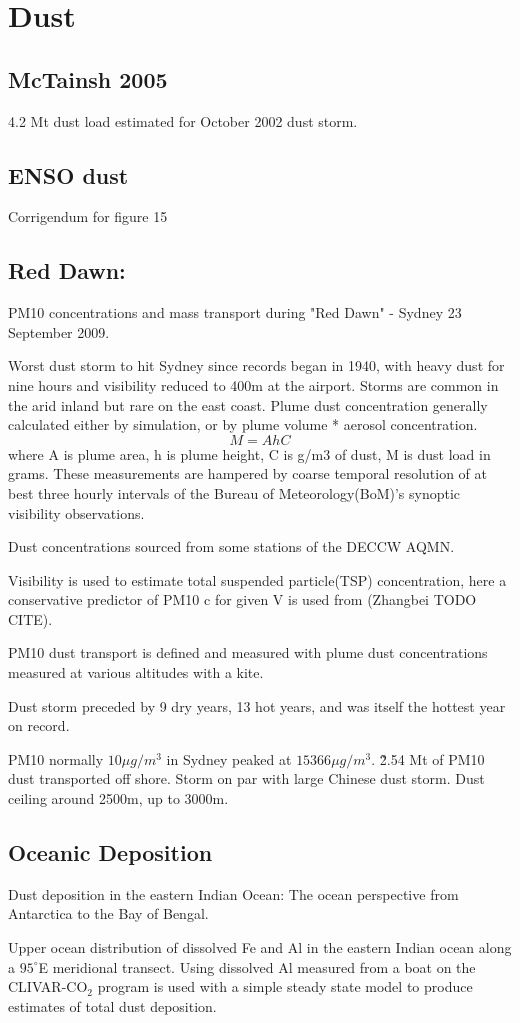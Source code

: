 \section{Dust}

\subsection{McTainsh 2005}
4.2 Mt dust load estimated for October 2002 dust storm.

\subsection{ENSO dust \cite{Rotstayn_2011}}
Corrigendum for figure 15

\subsection{Red Dawn: \cite{Leys_2011}}
PM10 concentrations and mass transport during "Red Dawn" - Sydney 23 September 2009.

Worst dust storm to hit Sydney since records began in 1940, with heavy dust for nine hours and visibility reduced to 400m at the airport.
Storms are common in the arid inland but rare on the east coast.
Plume dust concentration generally calculated either by simulation, or by plume volume * aerosol concentration.
$$M = AhC$$ 
where A is plume area, h is plume height, C is g/m3 of dust, M is dust load in grams.
These measurements are hampered by coarse temporal resolution of at best three hourly intervals of the Bureau of Meteorology(BoM)'s synoptic visibility observations.

Dust concentrations sourced from some stations of the DECCW AQMN.

Visibility is used to estimate total suspended particle(TSP) concentration, here a conservative predictor of PM10 c for given V is used from (Zhangbei TODO CITE).

PM10 dust transport is defined and measured with plume dust concentrations measured at various altitudes with a kite. 

Dust storm preceded by 9 dry years, 13 hot years, and was itself the hottest year on record.

PM10 normally $10{\mu}g/m^3$ in Sydney peaked at $15366{\mu}g/m^3$.
\~2.54 Mt of PM10 dust transported off shore.
Storm on par with large Chinese dust storm.
Dust ceiling around 2500m, up to 3000m.


\subsection{Oceanic Deposition \cite{Grand_2015}}
Dust deposition in the eastern Indian Ocean: The ocean perspective from Antarctica to the Bay of Bengal.

Upper ocean distribution of dissolved Fe and Al in the eastern Indian ocean along a $95^{\circ}$E meridional transect.
Using dissolved Al measured from a boat on the CLIVAR-CO$_{2}$ program is used with a simple steady state model to produce estimates of total dust deposition.
  
  
  
  
  
  